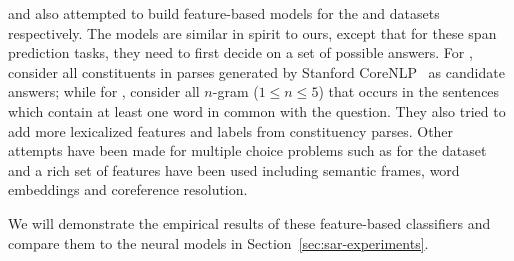  and  also attempted to build feature-based models for the  and  datasets respectively. The models are similar in spirit to ours, except that for these span prediction tasks, they need to first decide on a set of possible answers.
For ,  consider all constituents in parses generated by Stanford CoreNLP~\cite{manning2014stanford} as candidate answers; while for ,  consider all $n$-gram ($1 \leq n \leq 5$) that occurs in the sentences which contain at least one word in common with the question. They also tried to add more lexicalized features and labels from constituency parses. Other attempts have been made for multiple choice problems such as \cite{wang2015machine} for the  dataset and a rich set of features have been used including semantic frames, word embeddings and coreference resolution.

We will demonstrate the empirical results of these feature-based classifiers and compare them to the neural models in Section~\ref{sec:sar-experiments}.
